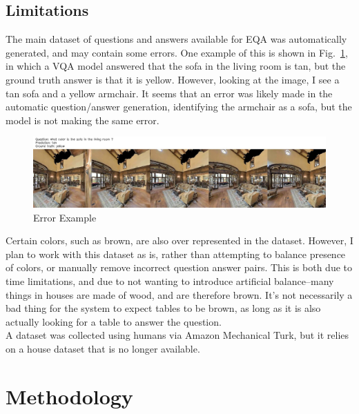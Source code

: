 \documentclass{article}
\begin{document}
\subsection{Limitations}
The main dataset of questions and answers available for EQA was automatically generated, and may contain some errors. One example of this is shown in Fig.~\ref{fig:err_ex}, in which a VQA model answered that the sofa in the living room is tan, but the ground truth answer is that it is yellow. However, looking at the image, I see a tan sofa and a yellow armchair. It seems that an error was likely made in the automatic question/answer generation, identifying the armchair as a sofa, but the model is not making the same error. \\
\begin{figure}[h]
	\centering
	\includegraphics[width=\textwidth]{../error_images/ckpt_0_121_image.jpg}
	\caption{Error Example}
	\label{fig:err_ex}
\end{figure}
Certain colors, such as brown, are also over represented in the dataset. However, I plan to work with this dataset as is, rather than attempting to balance presence of colors, or manually remove incorrect question answer pairs. This is both due to time limitations, and due to not wanting to introduce artificial balance--many things in houses are made of wood, and are therefore brown. It's not necessarily a bad thing for the system to expect tables to be brown, as long as it is also actually looking for a table to answer the question. \\
A dataset was collected using humans via Amazon Mechanical Turk, but it relies on a house dataset that is no longer available. \\
 

\section{Methodology}
\end{document}
